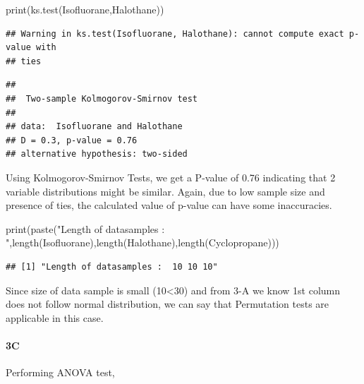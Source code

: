 \documentclass[
]{article}
\newenvironment{Shaded}{\begin{snugshade}}{\end{snugshade}}
\newcommand{\FunctionTok}[1]{\textcolor[rgb]{0.00,0.00,0.00}{#1}}
\newcommand{\NormalTok}[1]{#1}
\newcommand{\StringTok}[1]{\textcolor[rgb]{0.31,0.60,0.02}{#1}}
\begin{document}
\begin{Shaded}
\begin{Highlighting}[]
\FunctionTok{print}\NormalTok{(}\FunctionTok{ks.test}\NormalTok{(Isofluorane,Halothane))}
\end{Highlighting}
\end{Shaded}

\begin{verbatim}
## Warning in ks.test(Isofluorane, Halothane): cannot compute exact p-value with
## ties
\end{verbatim}

\begin{verbatim}
## 
##  Two-sample Kolmogorov-Smirnov test
## 
## data:  Isofluorane and Halothane
## D = 0.3, p-value = 0.76
## alternative hypothesis: two-sided
\end{verbatim}

Using Kolmogorov-Smirnov Tests, we get a P-value of 0.76 indicating that
2 variable distributions might be similar. Again, due to low sample size
and presence of ties, the calculated value of p-value can have some
inaccuracies.

\begin{Shaded}
\begin{Highlighting}[]
\FunctionTok{print}\NormalTok{(}\FunctionTok{paste}\NormalTok{(}\StringTok{"Length of datasamples : "}\NormalTok{,}\FunctionTok{length}\NormalTok{(Isofluorane),}\FunctionTok{length}\NormalTok{(Halothane),}\FunctionTok{length}\NormalTok{(Cyclopropane)))}
\end{Highlighting}
\end{Shaded}

\begin{verbatim}
## [1] "Length of datasamples :  10 10 10"
\end{verbatim}

Since size of data sample is small (10\textless30) and from 3-A we know
1st column does not follow normal distribution, we can say that
Permutation tests are applicable in this case.

\hypertarget{c-2}{%
\paragraph{\texorpdfstring{\textbf{3C}}{3C}}\label{c-2}}

Performing ANOVA test,
\end{document}
